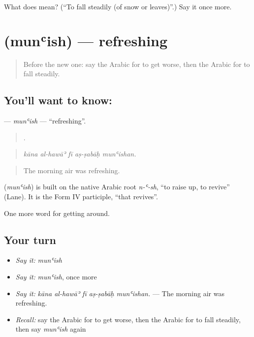 \begin{tcolorbox}[breakable,colback=teal!4,colframe=teal!35!black,title={Before you move on}]
What does  mean? (\textquotedblleft{}To fall steadily (of snow or leaves)\textquotedblright{}.) Say it once more.
\end{tcolorbox}
\section[\texorpdfstring{\ar{منعش} (munʿish)}{منعش (munʿish)}]{ (munʿish) — refreshing}

\label{lesson:AR-C486-munish}



\begin{quote}
Before the new one: say the Arabic for to get worse, then the Arabic for to fall steadily.
\end{quote}

\subsection*{You'll want to know: }
\textbf{} — \emph{munʿish} — \textquotedblleft{}refreshing\textquotedblright{}.

\begin{quote}
    .
\end{quote}

\begin{quote}
\emph{kāna al-hawāʾ fī aṣ-ṣabāḥ munʿishan.}
\end{quote}

\begin{quote}
The morning air was refreshing.
\end{quote}

\begin{cousinweb}
\textbf{} (\emph{munʿish}) is built on the native Arabic root \emph{n-ʿ-sh}, \textquotedblleft{}to raise up, to revive\textquotedblright{} (Lane). It is the Form IV participle, \textquotedblleft{}that revives\textquotedblright{}.
\end{cousinweb}

\begin{grammarlens}[title={What you've built}]
One more word for getting around.
\end{grammarlens}

\subsection*{Your turn}
\begin{itemize}
\raggedright
  \item \emph{Say it:} \emph{munʿish}
  \item \emph{Say it:} \emph{munʿish}, once more
  \item \emph{Say it:} \emph{kāna al-hawāʾ fī aṣ-ṣabāḥ munʿishan.} — The morning air was refreshing.
  \item \emph{Recall:} say the Arabic for to get worse, then the Arabic for to fall steadily, then say \emph{munʿish} again
\end{itemize}

